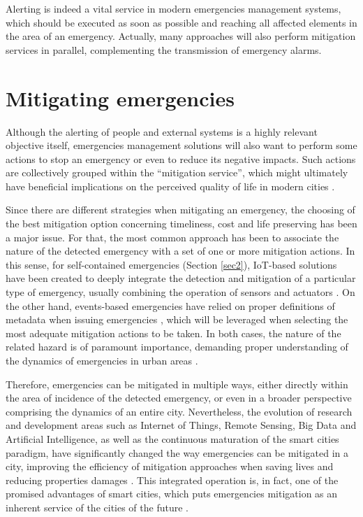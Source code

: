 \begin{refsection}
Alerting is indeed a vital service in modern emergencies management systems, which should be executed as soon as possible and reaching all affected elements in the area of an emergency. Actually, many approaches will also perform mitigation services in parallel, complementing the transmission of emergency alarms.

\section{Mitigating emergencies}\label{sec6}

Although the alerting of people and external systems is a highly relevant objective itself, emergencies management solutions will also want to perform some actions to stop an emergency or even to reduce its negative impacts. Such actions are collectively grouped within the ``mitigation service'', which might ultimately have beneficial implications on the perceived quality of life in modern cities \cite{emergenciesmetric1,smartsensing3}.

Since there are different strategies when mitigating an emergency, the choosing of the best mitigation option concerning timeliness, cost and life preserving has been a major issue. For that, the most common approach has been to associate the nature of the detected emergency with a set of one or more mitigation actions. In this sense, for self-contained emergencies (Section \ref{sec2}), IoT-based solutions have been created to deeply integrate the detection and mitigation of a particular type of emergency, usually combining the operation of sensors and actuators \cite{smartcities2,PlatformsSC}. On the other hand, events-based emergencies have relied on proper definitions of metadata when issuing emergencies \cite{emergenciesmetric2,emergenciesxml2}, which will be leveraged when selecting the most adequate mitigation actions to be taken. In both cases, the nature of the related hazard is of paramount importance, demanding proper understanding of the dynamics of emergencies in urban areas \cite{citiesemergencies1,emergenciesgeneral1}. 

Therefore, emergencies can be mitigated in multiple ways, either directly within the area of incidence of the detected emergency, or even in a broader perspective comprising the dynamics of an entire city. Nevertheless, the evolution of research and development areas such as Internet of Things, Remote Sensing, Big Data and Artificial Intelligence, as well as the continuous maturation of the smart cities paradigm, have significantly changed the way emergencies can be mitigated in a city, improving the efficiency of mitigation approaches when saving lives and reducing properties damages \cite{smartcities1,smartcities2,smartcities3}. This integrated operation is, in fact, one of the promised advantages of smart cities, which puts emergencies mitigation as an inherent service of the cities of the future \cite{smartcities9}. 


\end{refsection}
